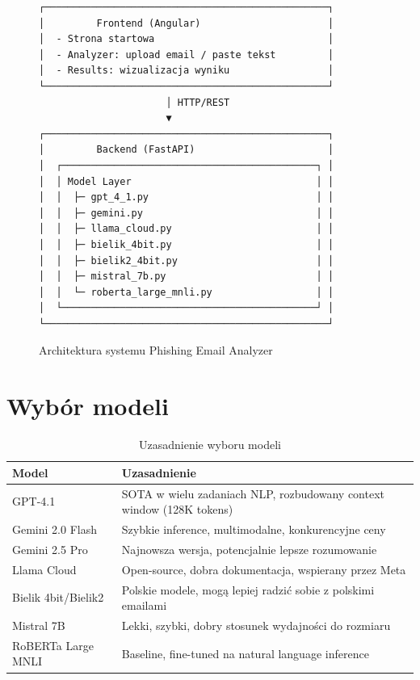 \documentclass[11pt]{extreport}
\begin{document}
\begin{figure}[H]
\centering
\begin{verbatim}
┌─────────────────────────────────────────────────┐
│         Frontend (Angular)                      │
│  - Strona startowa                              │
│  - Analyzer: upload email / paste tekst         │
│  - Results: wizualizacja wyniku                 │
└─────────────────────────────────────────────────┘
                      │ HTTP/REST
                      ▼
┌─────────────────────────────────────────────────┐
│         Backend (FastAPI)                       │
│  ┌────────────────────────────────────────────┐ │
│  │ Model Layer                                │ │
│  │  ├─ gpt_4_1.py                             │ │
│  │  ├─ gemini.py                              │ │
│  │  ├─ llama_cloud.py                         │ │
│  │  ├─ bielik_4bit.py                         │ │
│  │  ├─ bielik2_4bit.py                        │ │
│  │  ├─ mistral_7b.py                          │ │
│  │  └─ roberta_large_mnli.py                  │ │
│  └────────────────────────────────────────────┘ │
└─────────────────────────────────────────────────┘
\end{verbatim}
\caption{Architektura systemu Phishing Email Analyzer}
\label{fig:architektura}
\end{figure}

\section{Wybór modeli}
\label{sec:wybor-modeli}

\begin{table}[H]
\centering
\caption{Uzasadnienie wyboru modeli}
\label{tab:modele}
\begin{tabular}{@{}p{3.5cm}p{10cm}@{}}
\toprule
\textbf{Model} & \textbf{Uzasadnienie} \\ 
\midrule
GPT-4.1 & SOTA w wielu zadaniach NLP, rozbudowany context window (128K tokens) \\
Gemini 2.0 Flash & Szybkie inference, multimodalne, konkurencyjne ceny \\
Gemini 2.5 Pro & Najnowsza wersja, potencjalnie lepsze rozumowanie \\
Llama Cloud & Open-source, dobra dokumentacja, wspierany przez Meta \\
Bielik 4bit/Bielik2 & Polskie modele, mogą lepiej radzić sobie z polskimi emailami \\
Mistral 7B & Lekki, szybki, dobry stosunek wydajności do rozmiaru \\
RoBERTa Large MNLI & Baseline, fine-tuned na natural language inference \\
\bottomrule
\end{tabular}
\end{table}
\end{document}
